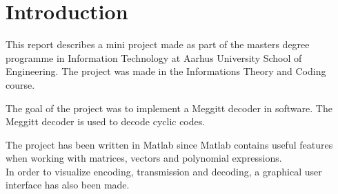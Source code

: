 \documentclass[Main]{subfiles}
\begin{document}
\chapter{Introduction}

This report describes a mini project made as part of the masters degree programme in Information Technology at Aarhus University School of Engineering. The project was made in the Informations Theory and Coding course.

The goal of the project was to implement a Meggitt decoder in software. The Meggitt decoder is used to decode cyclic codes. 

The project has been written in Matlab since Matlab contains useful features when working with matrices, vectors and polynomial expressions.  
\\In order to visualize encoding, transmission and decoding, a graphical user interface has also been made.  
\end{document}
